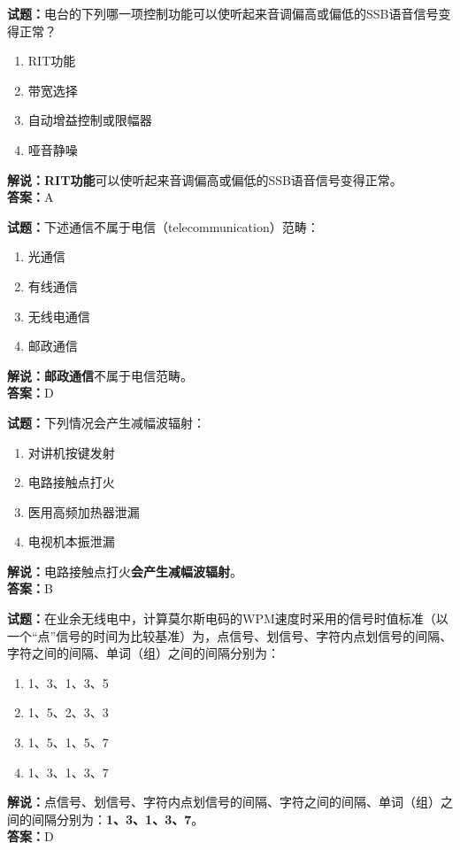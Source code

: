 \documentclass{ctexbook}
\begin{document}
\bigskip


\noindent\textbf{试题：}电台的下列哪一项控制功能可以使听起来音调偏高或偏低的SSB语音信号变得正常？
\begin{enumerate}[leftmargin=3em]
\item RIT功能
\item 带宽选择
\item 自动增益控制或限幅器
\item 哑音静噪
\end{enumerate}
\noindent\textbf{解说：}\textbf{RIT功能}可以使听起来音调偏高或偏低的SSB语音信号变得正常。\\\noindent\textbf{答案：}A




\bigskip


\noindent\textbf{试题：}下述通信不属于电信（telecommunication）范畴：
\begin{enumerate}[leftmargin=3em]
\item 光通信
\item 有线通信
\item 无线电通信
\item 邮政通信
\end{enumerate}
\noindent\textbf{解说：}\textbf{邮政通信}不属于电信范畴。\\\noindent\textbf{答案：}D



\bigskip


\noindent\textbf{试题：}下列情况会产生减幅波辐射：
\begin{enumerate}[leftmargin=3em]
\item 对讲机按键发射
\item 电路接触点打火
\item 医用高频加热器泄漏
\item 电视机本振泄漏
\end{enumerate}
\noindent\textbf{解说：}电路接触点打火\textbf{会产生减幅波辐射}。\\\noindent\textbf{答案：}B




\bigskip


\noindent\textbf{试题：}在业余无线电中，计算莫尔斯电码的WPM速度时采用的信号时值标准（以一个“点”信号的时间为比较基准）为，点信号、划信号、字符内点划信号的间隔、字符之间的间隔、单词（组）之间的间隔分别为：
\begin{enumerate}[leftmargin=3em]
\item 1、3、1、3、5
\item 1、5、2、3、3
\item 1、5、1、5、7
\item 1、3、1、3、7
\end{enumerate}
\noindent\textbf{解说：}点信号、划信号、字符内点划信号的间隔、字符之间的间隔、单词（组）之间的间隔分别为：\textbf{1、3、1、3、7}。\\\noindent\textbf{答案：}D
\end{document}
